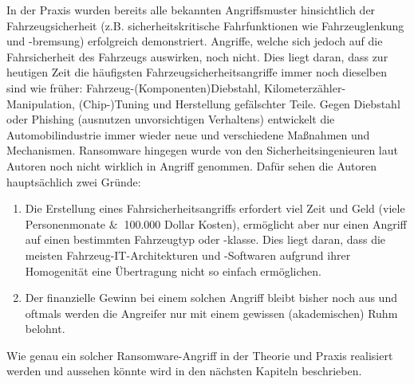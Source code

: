 In der Praxis wurden bereits alle bekannten Angriffsmuster hinsichtlich der 
Fahrzeugsicherheit (z.B. sicherheitskritische Fahrfunktionen wie Fahrzeuglenkung 
und -bremsung) erfolgreich demonstriert. Angriffe, welche sich jedoch auf die 
Fahrsicherheit des Fahrzeugs auswirken, noch nicht. Dies liegt daran, dass zur 
heutigen Zeit die häufigsten Fahrzeugsicherheitsangriffe immer noch dieselben sind 
wie früher: Fahrzeug-(Komponenten)Diebstahl, Kilometerzähler-Manipulation, (Chip-)Tuning 
und Herstellung gefälschter Teile. 
\newline
Gegen Diebstahl oder Phishing (ausnutzen unvorsichtigen Verhaltens) entwickelt die 
Automobilindustrie immer wieder neue und verschiedene Maßnahmen und Mechanismen. 
Ransomware hingegen wurde von den Sicherheitsingenieuren laut Autoren noch nicht wirklich 
in Angriff genommen. Dafür sehen die Autoren hauptsächlich zwei Gründe:
\begin{enumerate}
    \item Die Erstellung eines Fahrsicherheitsangriffs erfordert viel Zeit und Geld (viele 
    Personenmonate $\&$ $\>$100.000 Dollar Kosten), ermöglicht aber nur einen Angriff auf einen 
    bestimmten Fahrzeugtyp oder -klasse. Dies liegt daran, dass die meisten 
    Fahrzeug-IT-Architekturen und -Softwaren aufgrund ihrer Homogenität eine Übertragung 
    nicht so einfach ermöglichen.
    \item Der finanzielle Gewinn bei einem solchen Angriff bleibt bisher noch aus und oftmals 
    werden die Angreifer nur mit einem gewissen (akademischen) Ruhm belohnt. 
\end{enumerate}

Wie genau ein solcher Ransomware-Angriff in der Theorie und Praxis realisiert werden und 
aussehen könnte wird in den nächsten Kapiteln beschrieben.
